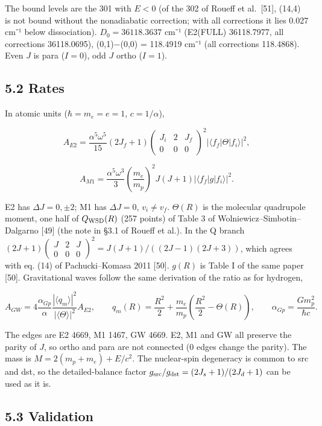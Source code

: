 \documentclass[
  a4paper,
]{article}
\begin{document}
The bound levels are the 301 with \(E<0\) (of the 302 of Roueff et
al.~{[}51{]}, (14,4) is not bound without the nonadiabatic correction;
with all corrections it lies 0.027 cm⁻¹ below dissociation).
\(D_0=36118.3637\) cm⁻¹ (E2(FULL) 36118.7977, all corrections
36118.0695), (0,1)−(0,0) = 118.4919 cm⁻¹ (all corrections 118.4868).
Even \(J\) is para (\(I=0\)), odd \(J\) ortho (\(I=1\)).

\subsection{5.2 Rates}\label{rates}

In atomic units (\(\hbar=m_e=e=1\), \(c=1/\alpha\)),

\[
A_{E2}=\frac{\alpha^5\omega^5}{15}(2J_f+1)\begin{pmatrix}J_i&2&J_f\\0&0&0\end{pmatrix}^2|\langle f_f|\Theta|f_i\rangle|^2,
\]

\[
A_{M1}=\frac{\alpha^5\omega^3}{3}\left(\frac{m_e}{m_p}\right)^2J(J+1)|\langle f_f|g|f_i\rangle|^2.
\]

E2 has \(\Delta J=0,\pm2\); M1 has \(\Delta J=0\), \(v_i\ne v_f\).
\(\Theta(R)\) is the molecular quadrupole moment, one half of
\(Q_{\rm WSD}(R)\) (257 points) of Table 3 of
Wolniewicz--Simbotin--Dalgarno {[}49{]} (the note in §3.1 of Roueff et
al.). In the Q branch
\((2J+1)\begin{pmatrix}J&2&J\\0&0&0\end{pmatrix}^2=J(J+1)/((2J-1)(2J+3))\),
which agrees with eq. (14) of Pachucki--Komasa 2011 {[}50{]}. \(g(R)\)
is Table I of the same paper {[}50{]}. Gravitational waves follow the
same derivation of the ratio as for hydrogen,

\[
A_{GW}=4\frac{\alpha_{Gp}}{\alpha}\frac{|\langle q_m\rangle|^2}{|\langle\Theta\rangle|^2}A_{E2},\qquad q_m(R)=\frac{R^2}{2}+\frac{m_e}{m_p}\left(\frac{R^2}{2}-\Theta(R)\right),\qquad \alpha_{Gp}=\frac{Gm_p^2}{\hbar c}.
\]

The edges are E2 4669, M1 1467, GW 4669. E2, M1 and GW all preserve the
parity of \(J\), so ortho and para are not connected (0 edges change the
parity). The mass is \(M=2(m_p+m_e)+E/c^2\). The nuclear-spin degeneracy
is common to src and dst, so the detailed-balance factor
\(g_{\rm src}/g_{\rm dst}=(2J_s+1)/(2J_d+1)\) can be used as it is.

\subsection{5.3 Validation}\label{validation}
\end{document}
